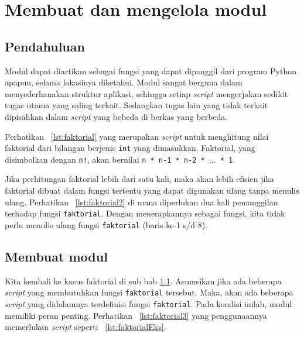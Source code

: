 \chapter{Membuat dan mengelola modul}
\section{Pendahuluan}
\label{sec:awalmodul}
Modul dapat diartikan sebagai fungsi yang dapat dipanggil dari program Python apapun, selama lokasinya diketahui. Modul sangat berguna dalam menyederhanakan struktur aplikasi, sehingga setiap \textit{script} mengerjakan sedikit tugas utama yang saling terkait. Sedangkan tugas lain yang tidak terkait dipisahkan dalam \textit{script} yang bebeda di berkas yang berbeda. 

Perhatikan \lstlistingname~\ref{lst:faktorial} yang merupakan \textit{script} untuk menghitung nilai faktorial dari bilangan berjenis \texttt{int} yang dimasukkan. Faktorial, yang disimbolkan dengan \texttt{n!}, akan bernilai \texttt{n * n-1 * n-2 * $\ldots$ * 1}.



Jika perhitungan faktorial lebih dari satu kali, maka akan lebih efisien jika faktorial dibuat dalam fungsi tertentu yang dapat digunakan ulang tanpa menulis ulang. Perhatikan \lstlistingname~\ref{lst:faktorial2} di mana diperlukan dua kali pemanggilan terhadap fungsi \texttt{faktorial}. Dengan menerapkannya sebagai fungsi, kita tidak perlu menulis ulang fungsi \texttt{faktorial} (baris ke-1 s/d 8).

\pagebreak


\section{Membuat modul}
Kita kembali ke kasus faktorial di sub bab \ref{sec:awalmodul}. Asumsikan jika ada beberapa \textit{script} yang membutuhkan fungsi \texttt{faktorial} tersebut. Maka, akan ada beberapa \textit{script} yang didalamnya terdefinisi fungsi \texttt{faktorial}. Pada kondisi inilah, modul memiliki peran penting. Perhatikan \lstlistingname~\ref{lst:faktorial3} yang penggunaannya memerlukan \textit{script} seperti \lstlistingname~\ref{lst:faktorialEks}.

